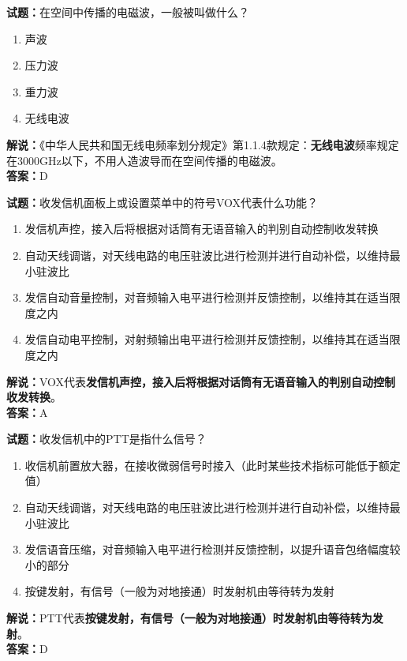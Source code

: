 \documentclass{ctexbook}
\begin{document}
\noindent\textbf{试题：}在空间中传播的电磁波，一般被叫做什么？

\begin{enumerate}[leftmargin=3em]
	\item 声波
	\item 压力波
	\item 重力波
	\item 无线电波
\end{enumerate}

\noindent\textbf{解说：}《中华人民共和国无线电频率划分规定》第1.1.4款规定：\textbf{无线电波}频率规定在3000\si{\GHz}以下，不用人造波导而在空间传播的电磁波。\\\noindent\textbf{答案：}D


\bigskip


\noindent\textbf{试题：}收发信机面板上或设置菜单中的符号VOX代表什么功能？

\begin{enumerate}[leftmargin=3em]
	\item 发信机声控，接入后将根据对话筒有无语音输入的判别自动控制收发转换
	\item 自动天线调谐，对天线电路的电压驻波比进行检测并进行自动补偿，以维持最小驻波比
	\item 发信自动音量控制，对音频输入电平进行检测并反馈控制，以维持其在适当限度之内
	\item 发信自动电平控制，对射频输出电平进行检测并反馈控制，以维持其在适当限度之内
\end{enumerate}

\noindent\textbf{解说：}VOX代表\textbf{发信机声控，接入后将根据对话筒有无语音输入的判别自动控制收发转换}。\\\noindent\textbf{答案：}A


\bigskip


\noindent\textbf{试题：}收发信机中的PTT是指什么信号？

\begin{enumerate}[leftmargin=3em]
	\item 收信机前置放大器，在接收微弱信号时接入（此时某些技术指标可能低于额定值）
	\item 自动天线调谐，对天线电路的电压驻波比进行检测并进行自动补偿，以维持最小驻波比
	\item 发信语音压缩，对音频输入电平进行检测并反馈控制，以提升语音包络幅度较小的部分
	\item 按键发射，有信号（一般为对地接通）时发射机由等待转为发射
\end{enumerate}

\noindent\textbf{解说：}PTT代表\textbf{按键发射，有信号（一般为对地接通）时发射机由等待转为发射}。\\\noindent\textbf{答案：}D
\end{document}
